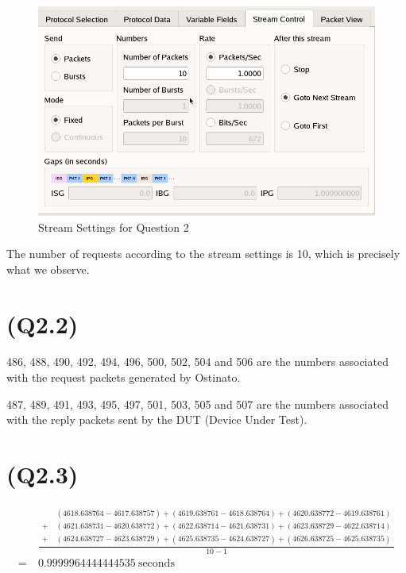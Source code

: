 \begin{figure}
\centering
\includegraphics{data/q2.1-stream-settings.png}
\caption{Stream Settings for Question 2}
\end{figure}

The number of requests according to the stream settings is 10, which is
precisely what we observe.

\hypertarget{q2.2}{%
\section{(Q2.2)}\label{q2.2}}

486, 488, 490, 492, 494, 496, 500, 502, 504 and 506 are the numbers
associated with the request packets generated by Ostinato.

487, 489, 491, 493, 495, 497, 501, 503, 505 and 507 are the numbers
associated with the reply packets sent by the DUT (Device Under Test).

\hypertarget{q2.3}{%
\section{(Q2.3)}\label{q2.3}}

\[
\begin{aligned}
&\frac{
\begin{aligned}
&(4618.638764 - 4617.638757)
+(4619.638761 - 4618.638764)
+(4620.638772 - 4619.638761)\\
+\ &(4621.638731 - 4620.638772)
+(4622.638714 - 4621.638731)
+(4623.638729 - 4622.638714)\\
+\ &(4624.638727 - 4623.638729)
+(4625.638735 - 4624.638727)
+(4626.638725 - 4625.638735)
\end{aligned}
}{10 - 1}\\
=\ & 0.9999964444444535\ \text{seconds}
\end{aligned}
\]

